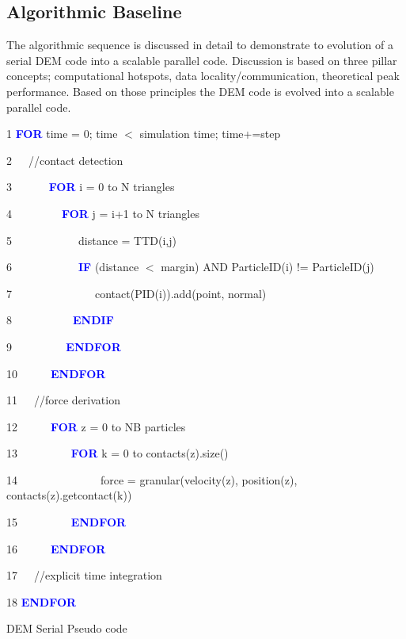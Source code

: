 \documentclass[times,12pt]{article}
\begin{document}
\subsection{Algorithmic Baseline}

The algorithmic sequence is discussed in detail to demonstrate to evolution of a serial DEM code into a scalable parallel code. Discussion is based on three pillar concepts; computational hotspots, data locality/communication, theoretical peak performance. Based on those principles the DEM code is evolved into a scalable parallel code.
 
\begin{algorithm}	

1 \textbf{\textcolor{blue}{FOR}} time = 0; time $<$ simulation time; time+=step

2~~~//contact detection
		
3~~~~~~	\textbf{\textcolor{blue}{FOR}} i = 0 to N triangles

4~~~~~~~~~\textbf{\textcolor{blue}{FOR}} j = i+1 to N triangles
				
5~~~~~~~~~~~~distance = TTD(i,j)
				
6~~~~~~~~~~~~\textbf{\textcolor{blue}{IF}} (distance $<$ margin) AND ParticleID(i) != ParticleID(j)

7~~~~~~~~~~~~~~~contact(PID(i)).add(point, normal)

8~~~~~~~~~~~\textbf{\textcolor{blue}{ENDIF}}
			
9~~~~~~~~~\textbf{\textcolor{blue}{	ENDFOR}}
			
10~~~~~~\textbf{\textcolor{blue}{ENDFOR}}

11~~~//force derivation
		
12~~~~~~\textbf{\textcolor{blue}{FOR}} z = 0 to NB particles

13~~~~~~~~~	\textbf{\textcolor{blue}{FOR}} k = 0 to contacts(z).size()

14~~~~~~~~~~~~~~~force = granular(velocity(z), position(z), contacts(z).getcontact(k))

15~~~~~~~~~	\textbf{\textcolor{blue}{ENDFOR}}

16~~~~~~\textbf{\textcolor{blue}{ENDFOR}}
	
17~~~//explicit time integration

18 \textbf{\textcolor{blue}{ENDFOR}}

\protect\caption{\label{algorithmPseudo}DEM Serial Pseudo code}
\end{algorithm}
\end{document}
